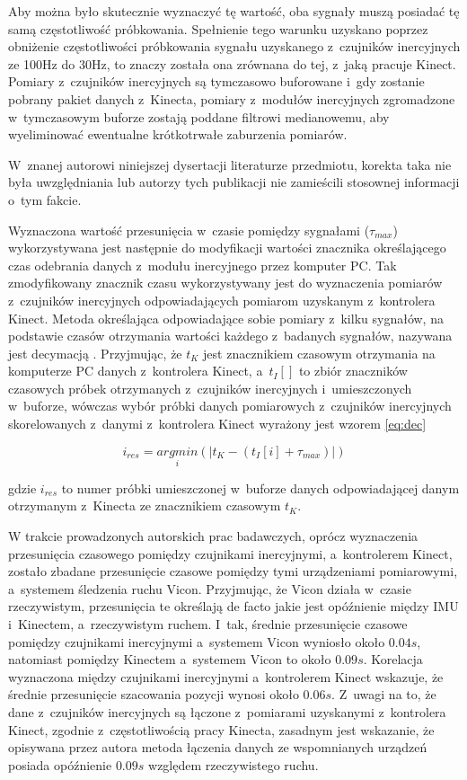 Aby można było skutecznie wyznaczyć tę wartość, oba sygnały muszą posiadać tę samą częstotliwość próbkowania. Spełnienie tego warunku uzyskano poprzez obniżenie częstotliwości próbkowania sygnału uzyskanego z~czujników inercyjnych ze 100Hz  do 30Hz, to znaczy została ona zrównana do tej, z~jaką pracuje Kinect. Pomiary z~czujników inercyjnych są tymczasowo buforowane i~gdy zostanie pobrany pakiet danych z~Kinecta, pomiary z~modułów inercyjnych zgromadzone w~tymczasowym buforze zostają poddane filtrowi medianowemu, aby wyeliminować ewentualne krótkotrwałe zaburzenia pomiarów. 
										
W~znanej autorowi niniejszej dysertacji literaturze przedmiotu, korekta taka nie była uwzględniania lub autorzy tych publikacji nie zamieścili stosownej informacji o~tym fakcie.

Wyznaczona wartość przesunięcia w~czasie pomiędzy sygnałami ($\tau_{max}$) wykorzystywana jest następnie do modyfikacji wartości znacznika określającego czas odebrania danych z~modułu inercyjnego przez komputer PC. Tak zmodyfikowany znacznik czasu wykorzystywany jest do wyznaczenia pomiarów z~czujników inercyjnych odpowiadających pomiarom uzyskanym z~kontrolera Kinect. Metoda określająca odpowiadające sobie pomiary z~kilku sygnałów, na podstawie czasów otrzymania wartości każdego z~badanych sygnałów, nazywana jest decymacją \cite{Hinton2001}. Przyjmując, że $t_K$ jest znacznikiem czasowym otrzymania na komputerze PC danych z~kontrolera Kinect, a~$t_I[]$ to zbiór znaczników czasowych próbek otrzymanych z~czujników inercyjnych i~umieszczonych w~buforze, wówczas wybór próbki danych pomiarowych z~czujników inercyjnych skorelowanych z~danymi z~kontrolera Kinect wyrażony jest wzorem \ref{eq:dec}
										
\begin{equation}
	i_{res} = \underset{i}{argmin}(|t_K-(t_I[i] + \tau_{max})|)
	\label{eq:dec}
\end{equation}

gdzie $i_{res}$ to numer próbki umieszczonej w~buforze danych odpowiadającej danym otrzymanym z~Kinecta ze znacznikiem czasowym $t_K$.
										
W trakcie prowadzonych autorskich prac badawczych, oprócz wyznaczenia przesunięcia czasowego pomiędzy czujnikami inercyjnymi, a~kontrolerem Kinect, zostało zbadane przesunięcie czasowe pomiędzy tymi urządzeniami pomiarowymi, a~systemem śledzenia ruchu Vicon. Przyjmując, że Vicon działa w~czasie rzeczywistym, przesunięcia te określają de facto jakie jest opóźnienie między IMU i~Kinectem, a~rzeczywistym ruchem. I~tak, średnie przesunięcie czasowe pomiędzy czujnikami inercyjnymi a~systemem Vicon wyniosło około $0.04s$, natomiast pomiędzy Kinectem a~systemem Vicon to około $0.09s$. Korelacja wyznaczona między czujnikami inercyjnymi a~kontrolerem Kinect wskazuje, że średnie przesunięcie szacowania pozycji wynosi około $0.06s$. Z~uwagi na to, że dane z~czujników inercyjnych są łączone z~pomiarami uzyskanymi z~kontrolera Kinect, zgodnie z~częstotliwością pracy Kinecta, zasadnym jest wskazanie, że opisywana przez autora metoda łączenia danych ze wspomnianych urządzeń posiada opóźnienie $0.09s$ względem rzeczywistego ruchu.
										
